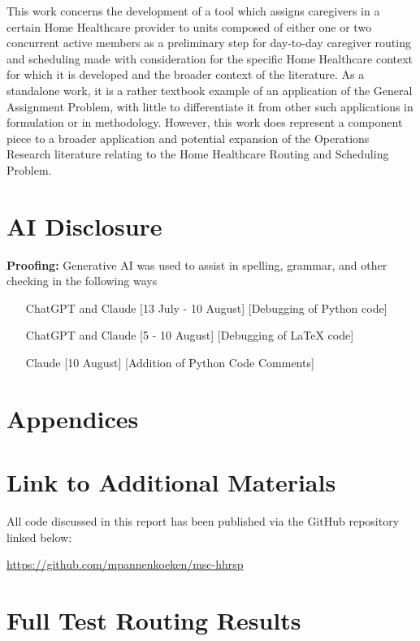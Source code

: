 \documentclass[11pt,twoside]{article}
\numberwithin{Theorem}{section}
\numberwithin{Definition}{section}
\numberwithin{Lemma}{section}
\numberwithin{Algorithm}{section}
\numberwithin{equation}{section}
\begin{document}
This work concerns the development of a tool which assigns caregivers in a certain Home Healthcare provider to units composed of either one or two concurrent active members as a preliminary step for day-to-day caregiver routing and scheduling made with consideration for the specific Home Healthcare context for which it is developed and the broader context of the literature. As a standalone work, it is a rather textbook example of an application of the General Assignment Problem, with little to differentiate it from other such applications in formulation or in methodology. However, this work does represent a component piece to a broader application and potential expansion of the Operations Research literature relating to the Home Healthcare Routing and Scheduling Problem.

\clearpage


\clearpage

\section*{AI Disclosure}
\textbf{Proofing:} Generative AI was used to assist in spelling, grammar, and other checking in the following ways
\begin{itemize}
	\item [ChatGPT and Claude] [13 July - 10 August] [Debugging of Python code]
	\item [ChatGPT and Claude] [5 - 10 August] [Debugging of LaTeX code]
	\item [Claude] [10 August] [Addition of Python Code Comments]
\end{itemize}

\appendix
\section*{Appendices}

\section{Link to Additional Materials}
\label{app:one}

All code discussed in this report has been published via the GitHub repository linked below:

\href{https://github.com/mpannenkoeken/msc-hhrsp}{https://github.com/mpannenkoeken/msc-hhrsp}

\section{Full Test Routing Results}
\label{app:two}
\end{document}
